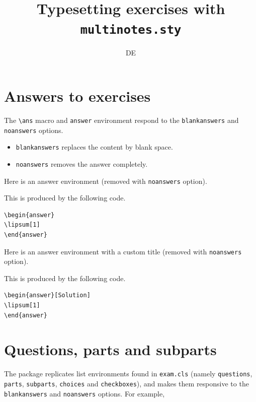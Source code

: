 \documentclass{article}
\title{Typesetting exercises with {\tt multinotes.sty}}
\author{DE}
\begin{document}
\maketitle

\section{Answers to exercises}

The \verb+\ans+ macro and \verb+answer+ environment respond to the \verb+blankanswers+ and \verb+noanswers+ options.

\begin{itemize}
\item \verb+blankanswers+ replaces the content by blank space. 
\item \verb+noanswers+ removes the answer completely.
\end{itemize}

Here is an answer environment (removed with \verb+noanswers+ option).
\begin{answer}
\lipsum[1]
\end{answer}

This is produced by the following code.
\begin{Verbatim}[frame=single]
\begin{answer}
\lipsum[1]
\end{answer}
\end{Verbatim}

Here is an answer environment with a custom title (removed with \verb+noanswers+ option).

\begin{answer}[Solution]
\lipsum[1]
\end{answer}

This is produced by the following code.
\begin{Verbatim}[frame=single]
\begin{answer}[Solution]
\lipsum[1]
\end{answer}
\end{Verbatim}

\section{Questions, parts and subparts}

The package replicates list environments found in {\tt exam.cls} (namely {\tt questions}, {\tt parts}, {\tt subparts}, {\tt choices} and {\tt checkboxes}), and makes them responsive to the {\tt blankanswers} and {\tt noanswers} options. For example,
\end{document}
